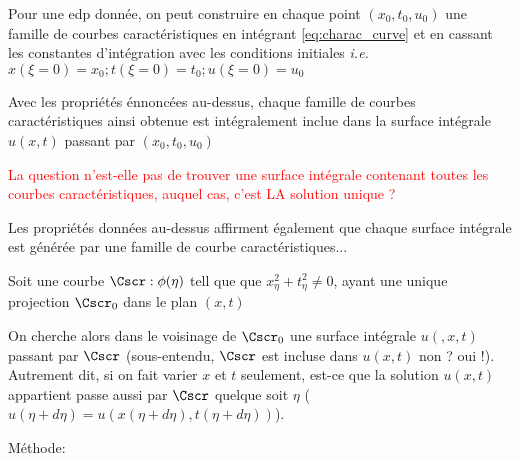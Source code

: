 \begin{itemize}
\item Pour une edp donnée, on peut construire en chaque point $(x_0,t_0,u_0)$ une famille de courbes caractéristiques en intégrant \eqref{eq:charac_curve} et en cassant les constantes d'intégration avec les conditions initiales \textit{i.e. $x(\xi=0)=x_0 ; t(\xi=0)=t_0;u(\xi=0)=u_0$}
\item Avec les propriétés énnoncées au-dessus, chaque famille de courbes caractéristiques ainsi obtenue est intégralement inclue dans la surface intégrale $u(x,t)$ passant par $(x_0,t_0,u_0)$
\textcolor{red}{\item[?] La question n'est-elle pas de trouver une surface intégrale contenant toutes les courbes caractéristiques, auquel cas, c'est LA solution unique ?}
\item Les propriétés données au-dessus affirment également que chaque surface intégrale est générée par une famille de courbe caractéristiques...
\item Soit une courbe $\Cscr: \phi(\eta)$ tell que que $x_\eta^2 + t_\eta^2 \neq 0$, ayant une unique projection $\Cscr_0$ dans le plan $(x,t)$
\item On cherche alors dans le voisinage de $\Cscr_0$ une surface intégrale $u(,x,t)$ passant par $\Cscr$ (sous-entendu, $\Cscr$ est incluse dans $u(x,t)$ non ? oui !). Autrement dit, si on fait varier $x$ et $t$ seulement, est-ce que la solution $u(x,t)$ appartient passe aussi par $\Cscr$ quelque soit $\eta$ ($u(\eta + d\eta)=u(x(\eta+d\eta),t(\eta+d\eta))$).
\end{itemize}
Méthode:
